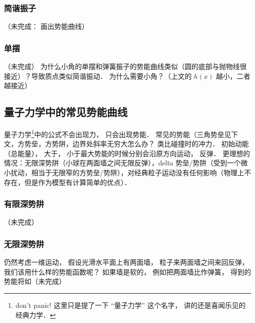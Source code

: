 \subsubsection{简谐振子}
（未完成： 画出势能曲线）

\subsubsection{单摆}
（未完成）
为什么小角的单摆和弹簧振子的势能曲线类似（圆的底部与抛物线很接近）？导致质点类似简谐振动． 为什么需要小角？（上文的 $h(x)$ 越小，二者越接近）

\subsection{量子力学中的常见势能曲线}


量子力学\footnote{don't panic! 这里只是提了一下 “量子力学” 这个名字， 讲的还是喜闻乐见的经典力学．}中的公式不会出现力， 只会出现势能． 常见的势能（三角势垒见下文，方势垒，方势阱，边界处斜率无穷大怎么办？ 类比碰撞时的冲力． 初始动能（总能量）， 大于， 小于最大势能的时候分别会沿原方向运动， 反弹． 更理想的情况：无限深势阱（小球在两面墙之间无限反弹），delta 势垒/势阱（受到一个微小扰动，相当于无限窄的方势垒/势阱），对经典粒子运动没有任何影响（物理上不存在，但是作为模型有计算简单的优点）．

\subsubsection{有限深势阱}
（未完成）

\subsubsection{无限深势阱}
仍然考虑一维运动， 假设光滑水平面上有两面墙， 粒子来两面墙之间来回反弹， 我们该用什么样的势能函数呢？ 如果墙是软的， 例如把两面墙比作弹簧， 得到的势能将如（未完成）

